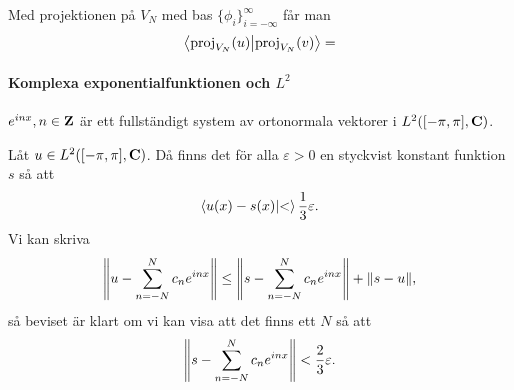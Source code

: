 \proof
Med projektionen på $V_{N}$ med bas $\{\phi_{i}\}_{i = -\infty}^{\infty}$ får man
\begin{align*}
	\bra{\text{proj}_{V_{N}}(u)}\ket{\text{proj}_{V_{N}}(v)} = 
\end{align*}

\paragraph{Komplexa exponentialfunktionen och $L^{2}$}
$e^{inx}, n\in\mathbf{Z}$ är ett fullständigt system av ortonormala vektorer i $L^{2}([-\pi, \pi], \mathbf{C})$.

\proof
Låt $u\in L^{2}([-\pi, \pi], \mathbf{C})$. Då finns det för alla $\varepsilon > 0$ en styckvist konstant funktion $s$ så att
\begin{align*}
	\bra{u(x) - s(x)}\ket{<} \frac{1}{3}\varepsilon.
\end{align*}
Vi kan skriva
\begin{align*}
	\norm{u - \sum\limits_{n = -N}^{N}c_{n}e^{inx}}\leq \norm{s - \sum\limits_{n = -N}^{N}c_{n}e^{inx}} + \norm{s - u},
\end{align*}
så beviset är klart om vi kan visa att det finns ett $N$ så att
\begin{align*}
	\norm{s - \sum\limits_{n = -N}^{N}c_{n}e^{inx}} < \frac{2}{3}\varepsilon.
\end{align*}